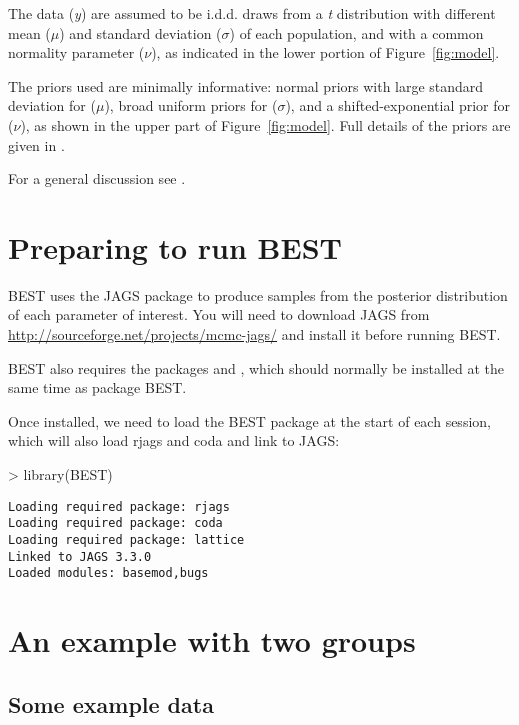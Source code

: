 \documentclass[a4paper]{article}
\begin{document}
The data (\emph{y}) are assumed to be i.d.d. draws from a \emph{t} distribution with different mean ($\mu$) and standard deviation ($\sigma$) of each population, and with a common normality parameter ($\nu$), as indicated in the lower portion of Figure~\ref{fig:model}.

The priors used are minimally informative: normal priors with large standard deviation for ($\mu$), broad uniform priors for ($\sigma$), and a shifted-exponential prior for ($\nu$), as shown in the upper part of Figure~\ref{fig:model}. Full details of the priors are given in \citet{kruschke2012BEST}.

For a general discussion see \citet{kruschke2011book}.

\section{Preparing to run BEST}
\label{sec:prepare}

BEST uses the JAGS package \citep{plummer2003} to produce samples from the posterior distribution of each parameter of interest. You will need to download JAGS from \url{http://sourceforge.net/projects/mcmc-jags/} and install it before running BEST.

BEST also requires the packages \verb@rjags@ and \verb@coda@, which should normally be installed at the same time as package BEST.

Once installed, we need to load the BEST package at the start of each \R{} session, which will also load rjags and coda and link to JAGS:
\begin{Schunk}
\begin{Sinput}
> library(BEST)
\end{Sinput}
\end{Schunk}
\begin{verbatim}
Loading required package: rjags
Loading required package: coda
Loading required package: lattice
Linked to JAGS 3.3.0
Loaded modules: basemod,bugs
\end{verbatim}



\section{An example with two groups}
\label{sec:grps2}

\subsection{Some example data}
\label{subsec:data2g}
\end{document}
